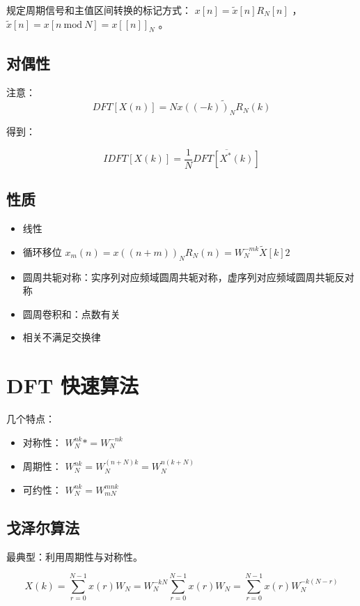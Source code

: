 \documentclass[cn,11pt,chinese,black,simple]{../elegantbook}
\begin{document}
规定周期信号和主值区间转换的标记方式： \(x[n] = \tilde{x}[n] R_N[n]\) ， \(\tilde{x}[n] = x [n \:\mathrm{ mod }\: N] =x[[n]]_N\) 。

\subsection{对偶性}


注意：\[DFT[X(n)] = N \tilde{x((-k))_N R_N(k)}\]

得到：

$$
I D F T [X(k)]=\frac{1}{N} \overline{D F T\left[X^{*}(k)\right]}
$$


\subsection{性质}

\begin{itemize}
    \item 线性
    \item 循环移位 $x_{m}(n)=x((n+m))_{N} R_{N}(n) = W_N^{-mk} \tilde{X}[k]2$
    \item 圆周共轭对称：实序列对应频域圆周共轭对称，虚序列对应频域圆周共轭反对称
    \item 圆周卷积和：点数有关
    \item 相关不满足交换律
\end{itemize}


\section{DFT 快速算法}

几个特点： 

\begin{itemize}
    \item 对称性： \(W_{N}^{nk} * = W_{N}^{-nk}\) 
    \item 周期性： \(W_{N}^{nk} = W_N^{(n + N) k} = W_N^{n (k + N)}\) 
    \item 可约性： \(W_N^{nk} = W_{m N}^{m n k} \)
\end{itemize}

\subsection{戈泽尔算法}

最典型：利用周期性与对称性。

\[X(k)=\sum_{r=0}^{N-1} x(r) W_{N}=W_{N}^{-k N} \sum_{r=0}^{N-1} x(r) W_{N}=\sum_{r=0}^{N-1} x(r) W_{N}^{-k(N-r)}\]
\end{document}
